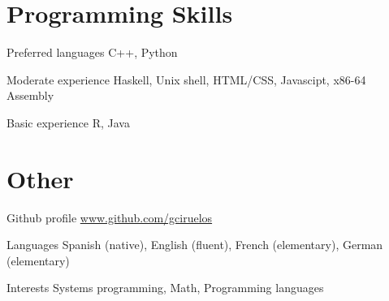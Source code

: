 \documentclass[a4paper,english,10pt]{article}
\begin{document}
\section{Programming Skills}
\begin{CV}
\item[Preferred languages] \hspace{1.2em} C++, Python
\item[Moderate experience] \hspace{0.7em} Haskell, Unix shell, HTML/CSS, Javascipt, x86-64 Assembly
\item[Basic experience]  \hspace{2.4em} R, Java
\end{CV}


\section{Other}
\begin{CV}
\item[Github profile] \href{http://www.github.com/gciruelos}{www.github.com/gciruelos}
\item[Languages] Spanish (native), English (fluent), French (elementary), German (elementary)
\item[Interests] Systems programming, Math, Programming languages
\end{CV}
\end{document}
